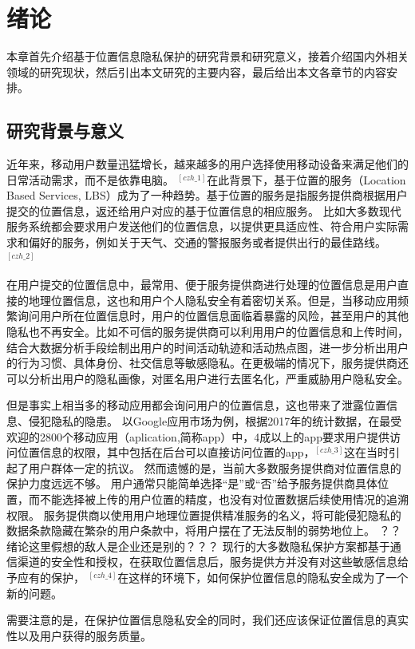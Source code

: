 \documentclass[zihao=-4]{ctexart}
\begin{document}
\section{绪论}
本章首先介绍基于位置信息隐私保护的研究背景和研究意义，接着介绍国内外相关领域的研究现状，然后引出本文研究的主要内容，最后给出本文各章节的内容安排。

\subsection{研究背景与意义}
近年来，移动用户数量迅猛增长，越来越多的用户选择使用移动设备来满足他们的日常活动需求，而不是依靠电脑。
$^{[czh\_1]}$在此背景下，基于位置的服务（Location Based Services, LBS）成为了一种趋势。基于位置的服务是指服务提供商根据用户提交的位置信息，返还给用户对应的基于位置信息的相应服务。
比如大多数现代服务系统都会要求用户发送他们的位置信息，以提供更具适应性、符合用户实际需求和偏好的服务，例如关于天气、交通的警报服务或者提供出行的最佳路线。$^{[czh\_2]}$
\par
在用户提交的位置信息中，最常用、便于服务提供商进行处理的位置信息是用户直接的地理位置信息，这也和用户个人隐私安全有着密切关系。但是，当移动应用频繁询问用户所在位置信息时，用户的位置信息面临着暴露的风险，甚至用户的其他隐私也不再安全。比如不可信的服务提供商可以利用用户的位置信息和上传时间，结合大数据分析手段绘制出用户的时间活动轨迹和活动热点图，进一步分析出用户的行为习惯、具体身份、社交信息等敏感隐私。在更极端的情况下，服务提供商还可以分析出用户的隐私画像，对匿名用户进行去匿名化，严重威胁用户隐私安全。
\par
但是事实上相当多的移动应用都会询问用户的位置信息，这也带来了泄露位置信息、侵犯隐私的隐患。
以Google应用市场为例，根据2017年的统计数据，在最受欢迎的2800个移动应用（aplication,简称app）中，4成以上的app要求用户提供访问位置信息的权限，其中包括在后台可以直接访问位置的app，$^{[czh\_3]}$这在当时引起了用户群体一定的抗议。
然而遗憾的是，当前大多数服务提供商对位置信息的保护力度远远不够。
用户通常只能简单选择“是”或“否”给予服务提供商具体位置，而不能选择被上传的用户位置的精度，也没有对位置数据后续使用情况的追溯权限。
服务提供商以使用用户地理位置提供精准服务的名义，将可能侵犯隐私的数据条款隐藏在繁杂的用户条款中，将用户摆在了无法反制的弱势地位上。
？？绪论这里假想的敌人是企业还是别的？？？
现行的大多数隐私保护方案都基于通信渠道的安全性和授权，在获取位置信息后，服务提供方并没有对这些敏感信息给予应有的保护，
$^{[czh\_4]}$在这样的环境下，如何保护位置信息的隐私安全成为了一个新的问题。
\par
需要注意的是，在保护位置信息隐私安全的同时，我们还应该保证位置信息的真实性以及用户获得的服务质量。
\end{document}
